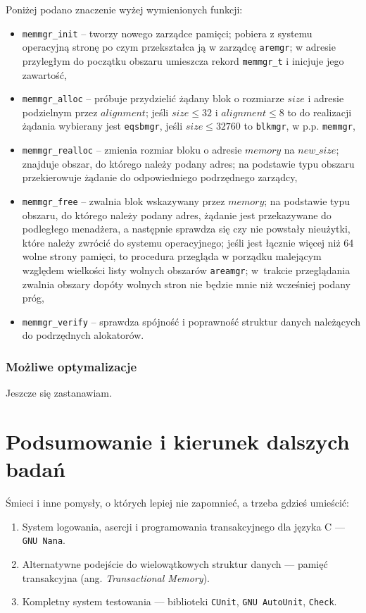 \documentclass[12pt,a4paper,titlepage,twoside]{mwart}
\begin{document}
Poniżej podano znaczenie wyżej wymienionych funkcji:
\begin{itemize}
\item \verb+memmgr_init+ -- tworzy nowego zarządce pamięci; pobiera z systemu
operacyjną stronę po czym przekształca ją w zarządcę \verb+aremgr+; w adresie
przyległym do początku obszaru umieszcza rekord \verb+memmgr_t+ i inicjuje jego
zawartość,
\item \verb+memmgr_alloc+ -- próbuje przydzielić żądany blok o rozmiarze $size$
i adresie podzielnym przez $alignment$; jeśli $size \le 32$ i $alignment \le 8$
to do realizacji żądania wybierany jest \verb+eqsbmgr+, jeśli $size \le 32760$
to \verb+blkmgr+, w p.p. \verb+memmgr+,
\item \verb+memmgr_realloc+ -- zmienia rozmiar bloku o adresie $memory$ na
$new\_size$; znajduje obszar, do którego należy podany adres; na podstawie typu
obszaru przekierowuje żądanie do odpowiedniego podrzędnego zarządcy,
\item \verb+memmgr_free+ -- zwalnia blok wskazywany przez $memory$; na
podstawie typu obszaru, do którego należy podany adres, żądanie jest
przekazywane do podległego menadżera, a następnie sprawdza się czy nie powstały
nieużytki, które należy zwrócić do systemu operacyjnego; jeśli jest łącznie
więcej niż 64 wolne strony pamięci, to procedura przegląda w porządku malejącym
względem wielkości listy wolnych obszarów \verb+areamgr+; w~trakcie
przeglądania zwalnia obszary dopóty wolnych stron nie będzie mnie niż wcześniej
podany próg,
\item \verb+memmgr_verify+ -- sprawdza spójność i poprawność struktur danych
należących do podrzędnych alokatorów.
\end{itemize}

\subsubsection{Możliwe optymalizacje}

Jeszcze się zastanawiam.

\newpage


\section{Podsumowanie i kierunek dalszych badań}
\hypertarget{Podsumowanie}{}

Śmieci i inne pomysły, o których lepiej nie zapomnieć, a trzeba gdzieś umieścić:
\begin{enumerate}
\item System logowania, asercji i programowania transakcyjnego dla języka C ---
\texttt{GNU Nana}.
\item Alternatywne podejście do wielowątkowych struktur danych --- pamięć
transakcyjna (ang. \textit{Transactional Memory}).
\item Kompletny system testowania --- biblioteki \texttt{CUnit}, \texttt{GNU
AutoUnit}, \texttt{Check}.
\end{enumerate}
\end{document}
